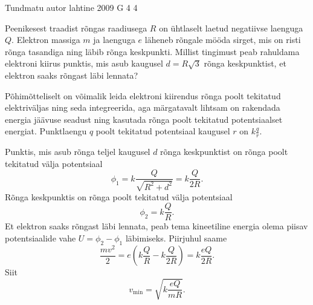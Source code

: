 {Tundmatu autor} %
{lahtine} %
{2009} %
{G 4} %
{4} %
{
\ifStatement
Peenikesest traadist rõngas raadiusega $R$ on ühtlaselt laetud negatiivse laenguga $Q$. Elektron massiga $m$ ja laenguga $e$ läheneb rõngale mööda sirget, mis on risti rõnga tasandiga ning läbib rõnga keskpunkti. Millist tingimust peab rahuldama elektroni kiirus punktis, mis asub kaugusel $d = R\sqrt 3$ rõnga keskpunktist, et elektron saaks rõngast läbi lennata?
\fi


\ifHint
Põhimõtteliselt on võimalik leida elektroni kiirendus rõnga poolt tekitatud elektriväljas ning seda integreerida, aga märgatavalt lihtsam on rakendada energia jäävuse seadust ning kasutada rõnga poolt tekitatud potentsiaalset energiat. Punktlaengu $q$ poolt tekitatud potentsiaal kaugusel $r$ on $k\frac{q}{r}$.
\fi


\ifSolution
Punktis, mis asub rõnga teljel kaugusel $d$ rõnga keskpunktist on rõnga poolt tekitatud välja potentsiaal
\[
\phi_{1}=k \frac{Q}{\sqrt{R^{2}+d^{2}}}=k \frac{Q}{2 R}.
\]
Rõnga keskpunktis on rõnga poolt tekitatud välja potentsiaal
\[
\phi_{2}=k \frac{Q}{R}.
\]
Et elektron saaks rõngast läbi lennata, peab tema kineetiline energia olema piisav
potentsiaalide vahe $U = \phi_2 - \phi_1$ läbimiseks. Piirjuhul saame
\[
\frac{m v^{2}}{2}=e\left(k \frac{Q}{R}-k \frac{Q}{2 R}\right)=k \frac{e Q}{2 R}.
\]
Siit
\[
v_{\min }=\sqrt{k \frac{e Q}{m R}}.
\]
\fi
}